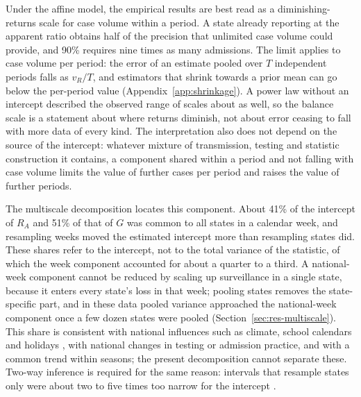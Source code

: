 Under the affine model, the empirical results are best read as a diminishing-returns scale for case volume within a period. A state already reporting at the apparent ratio obtains half of the precision that unlimited case volume could provide, and 90\% requires nine times as many admissions. The limit applies to case volume per period: the error of an estimate pooled over $T$ independent periods falls as $v_R/T$, and estimators that shrink towards a prior mean can go below the per-period value (Appendix~\ref{app:shrinkage}). A power law without an intercept described the observed range of scales about as well, so the balance scale is a statement about where returns diminish, not about error ceasing to fall with more data of every kind. The interpretation also does not depend on the source of the intercept: whatever mixture of transmission, testing and statistic construction it contains, a component shared within a period and not falling with case volume limits the value of further cases per period and raises the value of further periods.

The multiscale decomposition locates this component. About 41\% of the intercept of $R_A$ and 51\% of that of $G$ was common to all states in a calendar week, and resampling weeks moved the estimated intercept more than resampling states did. These shares refer to the intercept, not to the total variance of the statistic, of which the week component accounted for about a quarter to a third. A national-week component cannot be reduced by scaling up surveillance in a single state, because it enters every state's loss in that week; pooling states removes the state-specific part, and in these data pooled variance approached the national-week component once a few dozen states were pooled (Section~\ref{sec:res-multiscale}). This share is consistent with national influences such as climate, school calendars and holidays \citep{cauchemez2008estimating, shaman2010absolute}, with national changes in testing or admission practice, and with a common trend within seasons; the present decomposition cannot separate these. Two-way inference is required for the same reason: intervals that resample states only were about two to five times too narrow for the intercept \citep{owen2007pigeonhole, cameron2011robust}.

